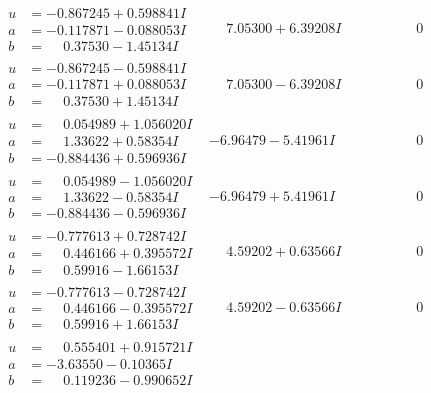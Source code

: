 \documentclass[1p]{elsarticle_modified}
\theoremstyle{definition}
\begin{document}
$$\begin{array}{c|c|c}
\begin{aligned}
u &= -0.867245 + 0.598841 I \\
a &= -0.117871 - 0.088053 I \\
b &= \phantom{-}0.37530 - 1.45134 I\end{aligned}
 & \phantom{-}7.05300 + 6.39208 I & \phantom{-0.000000 } 0 \\ \hline\begin{aligned}
u &= -0.867245 - 0.598841 I \\
a &= -0.117871 + 0.088053 I \\
b &= \phantom{-}0.37530 + 1.45134 I\end{aligned}
 & \phantom{-}7.05300 - 6.39208 I & \phantom{-0.000000 } 0 \\ \hline\begin{aligned}
u &= \phantom{-}0.054989 + 1.056020 I \\
a &= \phantom{-}1.33622 + 0.58354 I \\
b &= -0.884436 + 0.596936 I\end{aligned}
 & -6.96479 - 5.41961 I & \phantom{-0.000000 } 0 \\ \hline\begin{aligned}
u &= \phantom{-}0.054989 - 1.056020 I \\
a &= \phantom{-}1.33622 - 0.58354 I \\
b &= -0.884436 - 0.596936 I\end{aligned}
 & -6.96479 + 5.41961 I & \phantom{-0.000000 } 0 \\ \hline\begin{aligned}
u &= -0.777613 + 0.728742 I \\
a &= \phantom{-}0.446166 + 0.395572 I \\
b &= \phantom{-}0.59916 - 1.66153 I\end{aligned}
 & \phantom{-}4.59202 + 0.63566 I & \phantom{-0.000000 } 0 \\ \hline\begin{aligned}
u &= -0.777613 - 0.728742 I \\
a &= \phantom{-}0.446166 - 0.395572 I \\
b &= \phantom{-}0.59916 + 1.66153 I\end{aligned}
 & \phantom{-}4.59202 - 0.63566 I & \phantom{-0.000000 } 0 \\ \hline\begin{aligned}
u &= \phantom{-}0.555401 + 0.915721 I \\
a &= -3.63550 - 0.10365 I \\
b &= \phantom{-}0.119236 - 0.990652 I\end{aligned}

\end{array}$$
\end{document}
